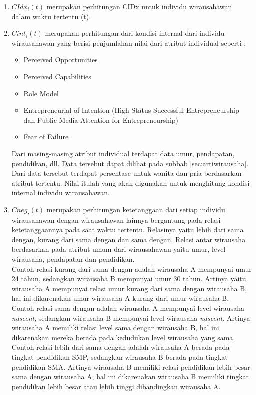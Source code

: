 \begin{enumerate}
	\item $CIdx_{i}(t)$ merupakan perhitungan CIDx untuk individu wirausahawan dalam waktu tertentu (t).
	\item $Cint_{i}(t)$ merupakan perhitungan dari kondisi internal dari individu wirausahawan yang berisi penjumlahan nilai dari atribut individual seperti :
	\begin{itemize}
			\item Perceived Opportunities
			\item Perceived Capabilities
			\item Role Model
			\item Entrepreneurial of Intention (High Status Successful Entrepreneurship dan Public Media Attention for Entrepreneurship)
			\item Fear of Failure
	\end{itemize}
Dari masing-masing atribut individual terdapat data umur, pendapatan, pendidikan, dll. Data tersebut dapat dilihat pada subbab \ref{sec:artiwirausaha}. Dari data tersebut terdapat persentase untuk wanita dan pria berdasarkan atribut tertentu. Nilai itulah yang akan digunakan untuk menghitung kondisi internal individu wirausahawan.
	\item $Cneg_{i}(t)$ merupakan perhitungan ketetanggaan dari setiap individu wirausahawan dengan wirausahawan lainnya bergantung pada relasi ketetanggaannya pada saat waktu tertentu. Relasinya yaitu lebih dari sama dengan, kurang dari sama dengan dan sama dengan. Relasi antar wirausaha berdasarkan pada atribut umum dari wirausahawan yaitu umur, level wirausaha, pendapatan dan pendidikan.\\ Contoh relasi kurang dari sama dengan adalah wirausaha A mempunyai umur 24 tahun, sedangkan wirausaha B mempunyai umur 30 tahun. Artinya yaitu wirausaha A mempunyai relasi umur kurang dari sama dengan wirausaha B, hal ini dikarenakan umur wirausaha A kurang dari umur wirausaha B.\\ Contoh relasi sama dengan adalah wirausaha A mempunyai level wirausaha \textit{nascent}, sedangkan wirausaha B mempunyai level wirausaha \textit{nascent}. Artinya wirausaha A memiliki relasi level sama dengan wirausaha B, hal ini dikarenakan mereka berada pada kedudukan level wirausaha yang sama.\\ Contoh relasi lebih dari sama dengan adalah wirausaha A berada pada tingkat pendidikan SMP, sedangkan wirausaha B berada pada tingkat pendidikan SMA. Artinya wirausaha B memiliki relasi pendidikan lebih besar sama dengan wirausaha A, hal ini dikarenakan wirausaha B memiliki tingkat pendidikan lebih besar atau lebih tinggi dibandingkan wirausaha A.

\end{enumerate}
